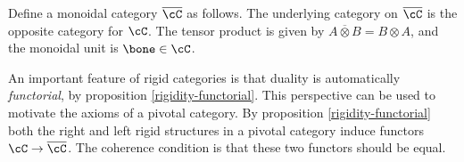 \begin{defn} Define a monoidal category $\overline{\cC}$ as follows. The underlying category on $\overline{\cC}$ is the opposite category for $\cC$. The tensor product is given by $A\overline{\otimes} B = B\otimes A$, and the monoidal unit is $\bone \in \cC$. 
\end{defn}

\begin{rem} An important feature of rigid categories is that duality is automatically {\em functorial}, by proposition \ref{rigidity-functorial}. This perspective can be used to motivate the axioms of a pivotal category. By proposition \ref{rigidity-functorial} both the right and left rigid structures in a pivotal category induce functors $\cC\to \overline{\cC}$. The coherence condition is that these two functors should be equal.
\end{rem}

